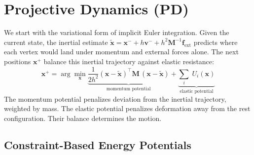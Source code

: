 \newcommand{\RR}{\mathbb{R}}
\newcommand{\x}{\mathbf{x}}
\newcommand{\vv}{\mathbf{v}}
\newcommand{\q}{\mathbf{q}}
\newcommand{\f}{\mathbf{f}}
\newcommand{\g}{\mathbf{g}}
\newcommand{\A}{\mathbf{A}}
\newcommand{\J}{\mathbf{J}}
\newcommand{\bb}{\mathbf{b}}
\newcommand{\M}{\mathbf{M}}
\newcommand{\C}{\mathbf{C}}
\newcommand{\F}{\mathbf{F}}
\newcommand{\R}{\mathbf{R}}
\newcommand{\I}{\mathbf{I}}
\newcommand{\zero}{\mathbf{0}}
\newcommand{\z}{\mathbf{z}}
\newcommand{\e}{\mathbf{e}}
\newcommand{\p}{\mathbf{p}}
\newcommand{\dd}{\mathbf{d}}
\newcommand{\G}{\mathbf{G}}
\newcommand{\rr}{\mathbf{r}}
\newcommand{\tb}{\mathbf{t}}
\newcommand{\Sb}{\mathbf{S}}
\newcommand{\B}{\mathbf{B}}
\newcommand{\LL}{\mathbf{L}}
\newcommand{\n}{\mathbf{n}}

\section{Projective Dynamics (PD) \cite{bouaziz2023projective}}
\label{sec:pd}

We start with the variational form of implicit Euler integration. Given the current state, the inertial estimate $\tilde{\x} = \x^- + h\vv^- + h^2\M^{-1}\f_{\text{ext}}$ predicts where each vertex would land under momentum and external forces alone. The next positions $\x^+$ balance this inertial trajectory against elastic resistance:
\begin{equation}
\label{eq:PD_variational_form}
\x^+ = \arg \min_{\x} 
    \underbrace{\frac{1}{2h^2}(\x - \tilde{\x})^\top\M\,(\x - \tilde{\x})}_{\text{momentum potential}} + 
    \underbrace{\sum_i\;U_i(\x)}_{\text{elastic potential}}
\end{equation}
The momentum potential penalizes deviation from the inertial trajectory, weighted by mass. The elastic potential penalizes deformation away from the rest configuration. Their balance determines the motion.

\subsection{Constraint-Based Energy Potentials}

